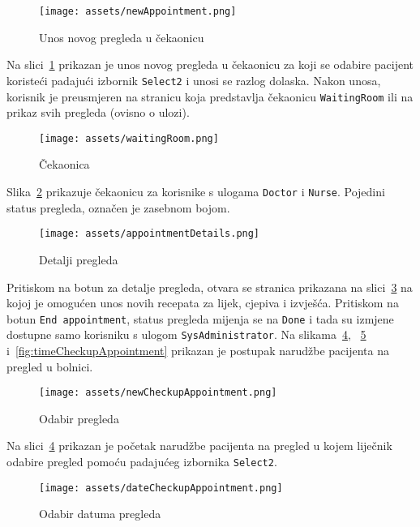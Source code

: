 \begin{figure}[H]
	\texttt{[image: assets/newAppointment.png]}
	\centering
	\caption{Unos novog pregleda u čekaonicu}
	\label{fig:newAppointment}
\end{figure}

Na slici~\ref{fig:newAppointment} prikazan je unos novog pregleda u čekaonicu za koji se odabire pacijent koristeći padajući izbornik \texttt{Select2} i unosi se razlog dolaska. Nakon unosa, korisnik je preusmjeren na stranicu koja predstavlja čekaonicu \texttt{WaitingRoom} ili na prikaz svih pregleda (ovisno o ulozi).

\begin{figure}[H]
	\texttt{[image: assets/waitingRoom.png]}
	\centering
	\caption{Čekaonica}
	\label{fig:waitingRoom}
\end{figure}

Slika~\ref{fig:waitingRoom} prikazuje čekaonicu za korisnike s ulogama \texttt{Doctor} i \texttt{Nurse}. Pojedini status pregleda, označen je zasebnom bojom.

\begin{figure}[H]
	\texttt{[image: assets/appointmentDetails.png]}
	\centering
	\caption{Detalji pregleda}
	\label{fig:appointmentDetails}
\end{figure}

Pritiskom na botun za detalje pregleda, otvara se stranica prikazana na slici~\ref{fig:appointmentDetails} na kojoj je omogućen unos novih recepata za lijek, cjepiva i izvješća. Pritiskom na botun \texttt{End appointment}, status pregleda mijenja se na \texttt{Done} i tada su izmjene dostupne samo korisniku s ulogom \texttt{SysAdministrator}. Na slikama~\ref{fig:newCheckupAppointment}, ~\ref{fig:dateCheckupAppointment} i~\ref{fig:timeCheckupAppointment} prikazan je postupak narudžbe pacijenta na pregled u bolnici.

\begin{figure}[H]
	\texttt{[image: assets/newCheckupAppointment.png]}
	\centering
	\caption{Odabir pregleda}
	\label{fig:newCheckupAppointment}
\end{figure}

Na slici~\ref{fig:newCheckupAppointment} prikazan je početak narudžbe pacijenta na pregled u kojem liječnik odabire pregled pomoću padajućeg izbornika \texttt{Select2}.

\begin{figure}[H]
	\texttt{[image: assets/dateCheckupAppointment.png]}
	\centering
	\caption{Odabir datuma pregleda}
	\label{fig:dateCheckupAppointment}
\end{figure}

